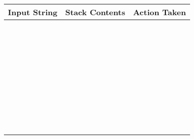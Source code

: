 \begin{tabular}{|p{5cm}|p{8cm}|p{2cm}|}
\hline
{\bf Input String} & {\bf Stack Contents} & {\bf Action Taken} \\
\hline
   &    &  \\
\hline
   &    &  \\
\hline
   &    &  \\
\hline
   &    &  \\
\hline
   &    &  \\
\hline
   &    &  \\
\hline
   &    &  \\
\hline
   &    &  \\
\hline
   &    &  \\
\hline
   &    &  \\
\hline
   &    &  \\
\hline
   &    &  \\
\hline
   &    &  \\
\hline
   &    &  \\
\hline
   &    &  \\
\hline
   &    &  \\
\hline
   &    &  \\
\hline
   &    &  \\
\hline
   &    &  \\
\hline
   &    &  \\
\hline
   &    &  \\
\hline
   &    &  \\
\hline
   &    &  \\
\hline
   &    &  \\
\hline
   &    &  \\
\hline
   &    &  \\
\hline
   &    &  \\
\hline
   &    &  \\
\hline
   &    &  \\
\hline
   &    &  \\
\hline
   &    &  \\
\hline
   &    &  \\
\hline
   &    &  \\
\hline
   &    &  \\
\hline
   &    &  \\
\hline
   &    &  \\
\hline
   &    &  \\
\hline
   &    &  \\
\hline
   &    &  \\
\hline
\end{tabular}

\vspace{1cm}

